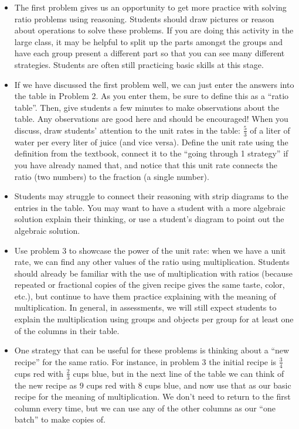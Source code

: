\documentclass[nooutcomes,noauthor,handout]{ximera}
\begin{document}
\begin{instructorNotes}
\begin{itemize}
	\item The first problem gives us an opportunity to get more practice with solving ratio problems using reasoning. Students should draw pictures or reason about operations to solve these problems. If you are doing this activity in the large class, it may be helpful to split up the parts amongst the groups and have each group present a different part so that you can see many different strategies. Students are often still practicing basic skills at this stage.
	\item If we have discussed the first problem well, we can just enter the answers into the table in Problem 2. As you enter them, be sure to define this as a ``ratio table''. Then, give students a few minutes to make observations about the table.  Any observations are good here and should be encouraged! When you discuss, draw students' attention to the unit rates in the table: $\frac53$ of a liter of water per every liter of juice (and vice versa). Define the unit rate using the definition from the textbook, connect it to the ``going through 1 strategy'' if you have already named that, and notice that this unit rate connects the ratio (two numbers) to the fraction (a single number). 
	\item Students may struggle to connect their reasoning with strip diagrams to the entries in the table. You may want to have a student with a more algebraic solution explain their thinking, or use a student's diagram to point out the algebraic solution.
	\item Use problem 3 to showcase the power of the unit rate: when we have a unit rate, we can find any other values of the ratio using multiplication. Students should already be familiar with the use of multiplication with ratios  (because repeated or fractional copies of the given recipe gives the same taste, color, etc.), but continue to have them practice explaining with the meaning of multiplication. In general, in assessments, we will still expect students to explain the multiplication using groups and objects per group for at least one of the columns in their table.
	\item One strategy that can be useful for these problems is thinking about a ``new recipe'' for the same ratio. For instance, in problem 3 the initial recipe is $\frac34$ cups red with $\frac23$ cups blue, but in the next line of the table we can think of the new recipe as $9$ cups red with $8$ cups blue, and now use that as our basic recipe for the meaning of multiplication. We don't need to return to the first column every time, but we can use any of the other columns as our ``one batch'' to make copies of.

\end{itemize}
\end{instructorNotes}
\end{document}
